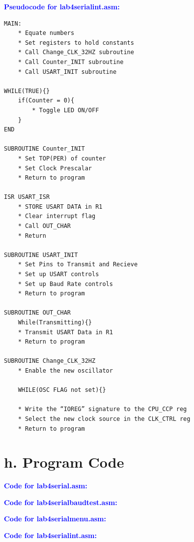 \documentclass[11pt]{article}
\theoremstyle{plain}
\theoremstyle{definition}
\begin{document}
%
%
\newpage
\textbf{\textcolor{blue}{Pseudocode for lab4\textunderscore serial\textunderscore int.asm:}}
\begin{tcolorbox}
\begin{verbatim}
MAIN:
    * Equate numbers
    * Set registers to hold constants
    * Call Change_CLK_32HZ subroutine
	* Call Counter_INIT subroutine
	* Call USART_INIT subroutine

WHILE(TRUE){}
	if(Counter = 0){
	    * Toggle LED ON/OFF
	}	
END

SUBROUTINE Counter_INIT
    * Set TOP(PER) of counter
    * Set Clock Prescalar
    * Return to program  

ISR USART_ISR
    * STORE USART DATA in R1
    * Clear interrupt flag
    * Call OUT_CHAR
    * Return
    
SUBROUTINE USART_INIT
    * Set Pins to Transmit and Recieve
    * Set up USART controls 
    * Set up Baud Rate controls
    * Return to program
    
SUBROUTINE OUT_CHAR
    While(Transmitting){}
    * Transmit USART Data in R1
    * Return to program     
    
SUBROUTINE Change_CLK_32HZ
    * Enable the new oscillator

    WHILE(OSC FLAG not set){}

    * Write the “IOREG” signature to the CPU_CCP reg
    * Select the new clock source in the CLK_CTRL reg
    * Return to program    
\end{verbatim}
\end{tcolorbox}










\newpage
\section*{h. Program Code}
\textbf{\textcolor{blue}{Code for lab4\textunderscore serial.asm:}}

\newpage
\textbf{\textcolor{blue}{Code for lab4\textunderscore serial\textunderscore baud\textunderscore test.asm:}}

\newpage
\textbf{\textcolor{blue}{Code for lab4\textunderscore serial\textunderscore menu.asm:}}

\newpage
\textbf{\textcolor{blue}{Code for lab4\textunderscore serial\textunderscore int.asm:}}

\end{document}
